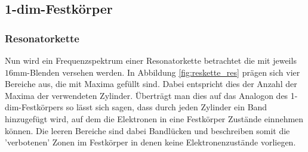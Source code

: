\subsection{1-dim-Festkörper}
\subsubsection*{Resonatorkette}
Nun wird ein Frequenzspektrum einer Resonatorkette betrachtet die mit jeweils $16$mm-Blenden versehen werden.
In Abbildung \ref{fig:reskette_res} prägen sich vier Bereiche aus, die mit Maxima gefüllt sind. Dabei entspricht dies der Anzahl der Maxima der verwendeten Zylinder.
Überträgt man dies auf das Analogon des 1-dim-Festkörpers so lässt sich sagen, dass durch jeden Zylinder ein Band hinzugefügt wird, auf dem die Elektronen
in eine Festkörper Zustände einnehmen können. Die leeren Bereiche sind dabei Bandlücken und beschreiben somit die 'verbotenen' Zonen im Festkörper in denen keine Elektronenzustände vorliegen.


